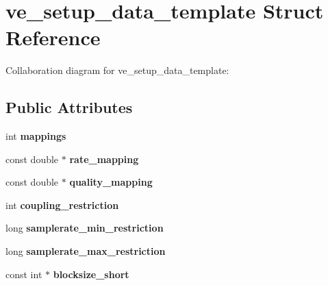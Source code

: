 \hypertarget{structve__setup__data__template}{\section{ve\+\_\+setup\+\_\+data\+\_\+template Struct Reference}
\label{structve__setup__data__template}
}


Collaboration diagram for ve\+\_\+setup\+\_\+data\+\_\+template\+:
\subsection*{Public Attributes}
\begin{DoxyCompactItemize}
\item 
\hypertarget{structve__setup__data__template_a1fae0454f1291ca150015e931e19c9c9}{int {\bfseries mappings}}\label{structve__setup__data__template_a1fae0454f1291ca150015e931e19c9c9}

\item 
\hypertarget{structve__setup__data__template_a7a0d9b35ef99f3fa83223093f7d4d8c3}{const double $\ast$ {\bfseries rate\+\_\+mapping}}\label{structve__setup__data__template_a7a0d9b35ef99f3fa83223093f7d4d8c3}

\item 
\hypertarget{structve__setup__data__template_ad56fff2e50fc8c8ecb023810a505e067}{const double $\ast$ {\bfseries quality\+\_\+mapping}}\label{structve__setup__data__template_ad56fff2e50fc8c8ecb023810a505e067}

\item 
\hypertarget{structve__setup__data__template_a19a542524d81938a074503da7b6aeea8}{int {\bfseries coupling\+\_\+restriction}}\label{structve__setup__data__template_a19a542524d81938a074503da7b6aeea8}

\item 
\hypertarget{structve__setup__data__template_ae6fea757e163c4adc1474593663cba5b}{long {\bfseries samplerate\+\_\+min\+\_\+restriction}}\label{structve__setup__data__template_ae6fea757e163c4adc1474593663cba5b}

\item 
\hypertarget{structve__setup__data__template_af5709bcc9b67d6f832f0d25f41615a0c}{long {\bfseries samplerate\+\_\+max\+\_\+restriction}}\label{structve__setup__data__template_af5709bcc9b67d6f832f0d25f41615a0c}

\item 
\hypertarget{structve__setup__data__template_a43f266bf64f0c8b6d1b22971a2071546}{const int $\ast$ {\bfseries blocksize\+\_\+short}}\label{structve__setup__data__template_a43f266bf64f0c8b6d1b22971a2071546}


\end{DoxyCompactItemize}
